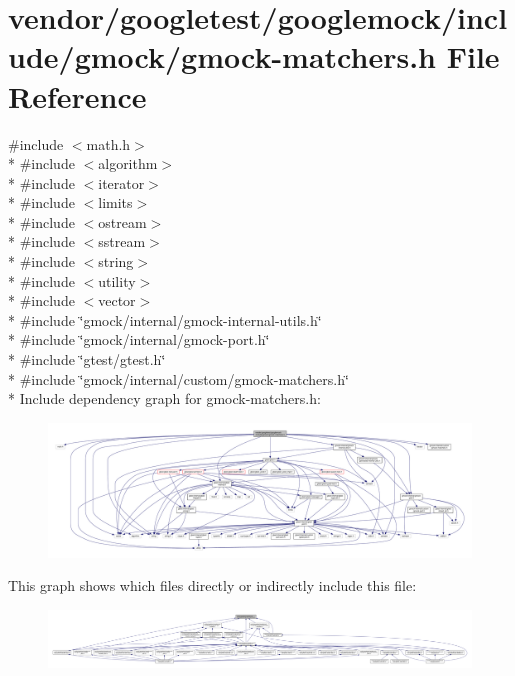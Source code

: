 \hypertarget{gmock-matchers_8h}{}\section{vendor/googletest/googlemock/include/gmock/gmock-\/matchers.h File Reference}
\label{gmock-matchers_8h}
{\ttfamily \#include $<$math.\+h$>$}\\*
{\ttfamily \#include $<$algorithm$>$}\\*
{\ttfamily \#include $<$iterator$>$}\\*
{\ttfamily \#include $<$limits$>$}\\*
{\ttfamily \#include $<$ostream$>$}\\*
{\ttfamily \#include $<$sstream$>$}\\*
{\ttfamily \#include $<$string$>$}\\*
{\ttfamily \#include $<$utility$>$}\\*
{\ttfamily \#include $<$vector$>$}\\*
{\ttfamily \#include \char`\"{}gmock/internal/gmock-\/internal-\/utils.\+h\char`\"{}}\\*
{\ttfamily \#include \char`\"{}gmock/internal/gmock-\/port.\+h\char`\"{}}\\*
{\ttfamily \#include \char`\"{}gtest/gtest.\+h\char`\"{}}\\*
{\ttfamily \#include \char`\"{}gmock/internal/custom/gmock-\/matchers.\+h\char`\"{}}\\*
Include dependency graph for gmock-\/matchers.h\+:
\nopagebreak
\begin{figure}[H]
\begin{center}
\leavevmode
\includegraphics[width=350pt]{gmock-matchers_8h__incl}
\end{center}
\end{figure}
This graph shows which files directly or indirectly include this file\+:
\nopagebreak
\begin{figure}[H]
\begin{center}
\leavevmode
\includegraphics[width=350pt]{gmock-matchers_8h__dep__incl}
\end{center}
\end{figure}
